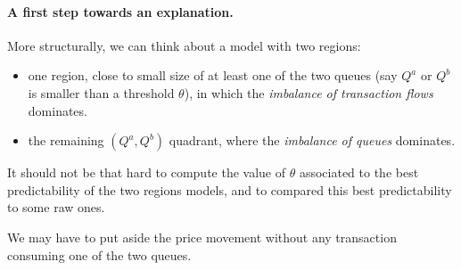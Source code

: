 \documentclass[a4paper,leqno]{article}
\begin{document}
\paragraph{A first step towards an explanation.}
More structurally, we can think about a model with two regions:
\begin{itemize}
\item one region, close to small size of at least one of the two queues (say $Q^a$ or $Q^b$ is smaller than a threshold $\theta$), in which the \emph{imbalance of transaction flows} dominates.
\item the remaining $(Q^a,Q^b)$ quadrant, where the \emph{imbalance of queues} dominates.
\end{itemize}
\medskip

It should not be that hard to compute the value of $\theta$ associated to the best predictability of the two regions models, and to compared this best predictability to some raw ones.
\medskip

We may have to put aside the price movement without any transaction consuming one of the two queues.
\end{document}
